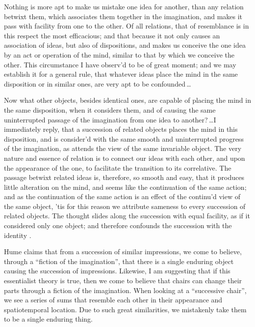 \documentclass[11pt]{article}
\newenvironment{squote}{%
\begin{spacing}{1}
\begin{list}{}{%
\setlength{\labelwidth}{0pt}%
\rightmargin\leftmargin%
}
\item\relax
}{%
\end{list}%
\end{spacing}
}
\begin{document}
\begin{spacing}{1.5}
\begin{squote}
Nothing is more apt to make us mistake one idea for another, than any
relation betwixt them, which associates them together in the
imagination, and makes it pass with facility from one to the other.
Of all relations, that of resemblance is in this respect the most
efficacious; and that because it not only causes an association of
ideas, but also of dispositions, and makes us conceive the one idea by
an act or operation of the mind, similar to that by which we conceive
the other.  This circumstance I have observ'd to be of great moment;
and we may establish it for a general rule, that whatever ideas place
the mind in the same disposition or in similar ones, are very apt to
be confounded\,\ldots

Now what other objects, besides identical ones, are capable of placing
the mind in the same disposition, when it considers them, and of
causing the same uninterrupted passage of the imagination from one
idea to another?\,\ldots I immediately reply, that a succession of
related objects places the mind in this disposition, and is consider'd
with the same smooth and uninterrupted progress of the imagination, as
attends the view of the same invariable object.  The very nature and
essence of relation is to connect our ideas with each other, and upon
the appearance of the one, to facilitate the transition to its
correlative.  The passage betwixt related ideas is, therefore, so
smooth and easy, that it produces little alteration on the mind, and
seems like the continuation of the same action; and as the
continuation of the same action is an effect of the continu'd view of
the same object, 'tis for this reason we attribute sameness to every
succession of related objects.  The thought slides along the
succession with equal facility, as if it considered only one object;
and therefore confounds the succession with the identity
\citep[135]{hume2000}.
\end{squote}

Hume claims that from a succession of similar impressions, we come to
believe, through a ``fiction of the imagination'', that there is a
single enduring object causing the succession of impressions.
Likewise, I am suggesting that if this essentialist theory is true,
then we come to believe that chairs can change their parts through a
fiction of the imagination.  When looking at a ``successive chair'',
we see a series of sums that resemble each other in their appearance
and spatiotemporal location.  Due to such great similarities, we
mistakenly take them to be a single enduring thing.


\end{spacing}
\end{document}
